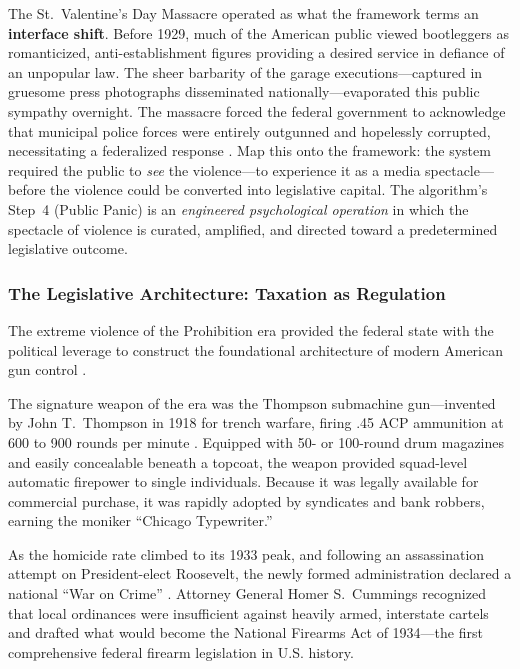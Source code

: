 The St.\ Valentine's Day Massacre operated as what the framework terms an \textbf{interface shift}. Before 1929, much of the American public viewed bootleggers as romanticized, anti-establishment figures providing a desired service in defiance of an unpopular law. The sheer barbarity of the garage executions---captured in gruesome press photographs disseminated nationally---evaporated this public sympathy overnight. The massacre forced the federal government to acknowledge that municipal police forces were entirely outgunned and hopelessly corrupted, necessitating a federalized response \cite{poynter_valentine, natgeo_machinegun}. Map this onto the framework: the system required the public to \textit{see} the violence---to experience it as a media spectacle---before the violence could be converted into legislative capital. The algorithm's Step~4 (Public Panic) is an \textit{engineered psychological operation} in which the spectacle of violence is curated, amplified, and directed toward a predetermined legislative outcome.

\subsubsection{The Legislative Architecture: Taxation as Regulation}

The extreme violence of the Prohibition era provided the federal state with the political leverage to construct the foundational architecture of modern American gun control \cite{nfa1934, atf_nfa}.

The signature weapon of the era was the Thompson submachine gun---invented by John T.\ Thompson in 1918 for trench warfare, firing .45 ACP ammunition at 600 to 900 rounds per minute \cite{wikipedia_thompson}. Equipped with 50- or 100-round drum magazines and easily concealable beneath a topcoat, the weapon provided squad-level automatic firepower to single individuals. Because it was legally available for commercial purchase, it was rapidly adopted by syndicates and bank robbers, earning the moniker ``Chicago Typewriter.''

As the homicide rate climbed to its 1933 peak, and following an assassination attempt on President-elect Roosevelt, the newly formed administration declared a national ``War on Crime'' \cite{fbi_gangster, pbs_gangsters}. Attorney General Homer S.\ Cummings recognized that local ordinances were insufficient against heavily armed, interstate cartels and drafted what would become the National Firearms Act of 1934---the first comprehensive federal firearm legislation in U.S. history.


